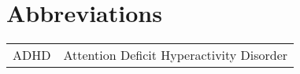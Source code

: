 \chapter*{Abbreviations}
\begin{tabular}[t]{l l}
ADHD & Attention Deficit Hyperactivity Disorder\\
\end{tabular}